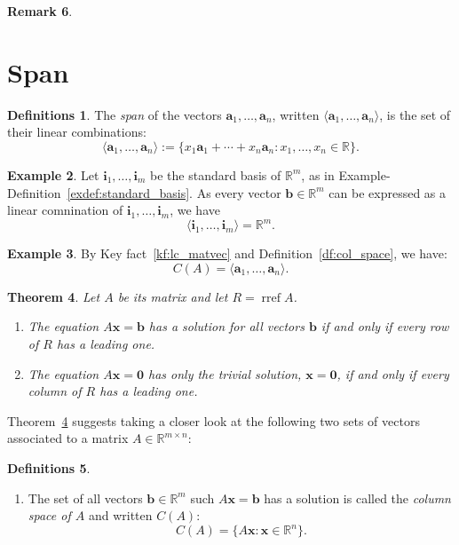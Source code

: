\documentclass[12pt]{amsart}
\newcommand{\RR}{\mathbb{R}}
\DeclareMathOperator{\rref}{rref}
\newtheorem{theorem}{Theorem}[section]
\theoremstyle{definition} \newtheorem{definition}[theorem]{Definition}
\newtheorem{definitions}[theorem]{Definitions}
\newtheorem{remark}[theorem]{Remark} \newtheorem{remarks}[theorem]{Remarks}
\newtheorem{example}[theorem]{Example}
\newcommand{\ba}{\mathbf{a}}
\newcommand{\bb}{\mathbf{b}}
\newcommand{\bi}{\mathbf{i}}
\newcommand{\bx}{\mathbf{x}}
\newcommand{\bzero}{\mathbf{0}}
\newcommand{\bas}{\ba_1,\ldots,\ba_n}
\begin{document}
\begin{remark}
\section{Span}

\begin{definitions}\label{df:span}
  The \emph{span} of the vectors $\bas$, written $\langle \bas\rangle$, is the set of their linear combinations:
  \[ 
    \langle \bas \rangle := \{x_1\ba_1+\cdots + x_n\ba_n
    : x_1,\ldots,x_n\in\RR\}.
  \]
\end{definitions}

\begin{example}
  Let $\bi_1,\ldots,\bi_m$ be the standard basis of $\RR^m$, as in Example-Definition~\ref{exdef:standard_basis}. As every vector $\bb\in\RR^m$ can be expressed as a linear comnination of $\bi_1,\ldots,\bi_m$, we have
  \[
    \langle \bi_1,\ldots,\bi_m\rangle = \RR^m.
  \]
\end{example}

\begin{example}
  By Key fact~\ref{kf:lc_matvec} and Definition~\ref{df:col_space}, we have:
  \begin{equation}\label{eq:col_space_is_span}
    C(A) = \langle \bas \rangle.
  \end{equation}
\end{example}

\begin{theorem}\label{th:leading_ones} Let $A$ be its matrix and let $R=\rref
	A$.  \begin{enumerate} \item The equation $A\bx=\bb$ has a solution for
		all vectors $\bb$ if and only if every row of $R$ has a leading
		one.  \item The equation $A\bx=\bzero$ has only the trivial
		solution, $\bx=\bzero$, if and only if every column of $R$ has
		a leading one.

	\end{enumerate} \end{theorem}

Theorem~\ref{th:leading_ones} suggests taking a closer look at the following
two sets of vectors associated to a matrix $A\in\RR^{m\times n}$:
\begin{definitions}\hfill \begin{enumerate} \item The set of all vectors
	$\bb\in\RR^m$ such $A\bx=\bb$ has a solution is called the \emph{column
	space of $A$} and written $C(A)$: \[ C(A) = \{A\bx : \bx\in \RR^n\}.
\]



\end{enumerate}
\end{definitions}
\end{remark}
\end{document}
